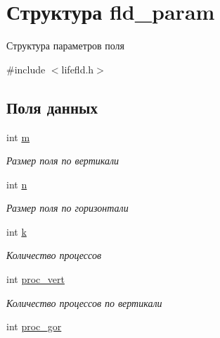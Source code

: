 \hypertarget{structfld__param}{}\section{Структура fld\+\_\+param}
\label{structfld__param}


Структура параметров поля  




{\ttfamily \#include $<$lifefld.\+h$>$}

\subsection*{Поля данных}
\begin{DoxyCompactItemize}
\item 
int \hyperlink{structfld__param_a742204794ea328ba293fe59cec79b990}{m}\hypertarget{structfld__param_a742204794ea328ba293fe59cec79b990}{}\label{structfld__param_a742204794ea328ba293fe59cec79b990}

\begin{DoxyCompactList}\small\item\em Размер поля по вертикали \end{DoxyCompactList}\item 
int \hyperlink{structfld__param_a76f11d9a0a47b94f72c2d0e77fb32240}{n}\hypertarget{structfld__param_a76f11d9a0a47b94f72c2d0e77fb32240}{}\label{structfld__param_a76f11d9a0a47b94f72c2d0e77fb32240}

\begin{DoxyCompactList}\small\item\em Размер поля по горизонтали \end{DoxyCompactList}\item 
int \hyperlink{structfld__param_ab66ed8e0098c0a86b458672a55a9cca9}{k}\hypertarget{structfld__param_ab66ed8e0098c0a86b458672a55a9cca9}{}\label{structfld__param_ab66ed8e0098c0a86b458672a55a9cca9}

\begin{DoxyCompactList}\small\item\em Количество процессов \end{DoxyCompactList}\item 
int \hyperlink{structfld__param_a58e5c5695a2e64b7374969806d90191a}{proc\+\_\+vert}\hypertarget{structfld__param_a58e5c5695a2e64b7374969806d90191a}{}\label{structfld__param_a58e5c5695a2e64b7374969806d90191a}

\begin{DoxyCompactList}\small\item\em Количество процессов по вертикали \end{DoxyCompactList}\item 
int \hyperlink{structfld__param_accbd2c2ef61b4a1eee1400037bd5a06a}{proc\+\_\+gor}\hypertarget{structfld__param_accbd2c2ef61b4a1eee1400037bd5a06a}{}\label{structfld__param_accbd2c2ef61b4a1eee1400037bd5a06a}


\end{DoxyCompactItemize}
